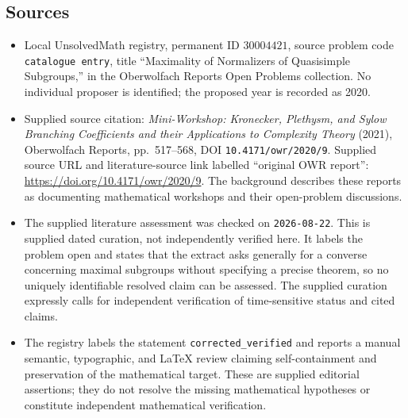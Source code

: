 \documentclass[11pt]{article}
\begin{document}
\subsection{Sources}
\begin{itemize}
\item Local UnsolvedMath registry, permanent ID \(30004421\), source problem code \texttt{catalogue entry}, title ``Maximality of Normalizers of Quasisimple Subgroups,'' in the Oberwolfach Reports Open Problems collection. No individual proposer is identified; the proposed year is recorded as 2020.
\item Supplied source citation: \emph{Mini-Workshop: Kronecker, Plethysm, and Sylow Branching Coefficients and their Applications to Complexity Theory} (2021), Oberwolfach Reports, pp.\ 517--568, DOI \texttt{10.4171/owr/2020/9}. Supplied source URL and literature-source link labelled ``original OWR report'': \url{https://doi.org/10.4171/owr/2020/9}. The background describes these reports as documenting mathematical workshops and their open-problem discussions.
\item The supplied literature assessment was checked on \texttt{2026-08-22}. This is supplied dated curation, not independently verified here. It labels the problem open and states that the extract asks generally for a converse concerning maximal subgroups without specifying a precise theorem, so no uniquely identifiable resolved claim can be assessed. The supplied curation expressly calls for independent verification of time-sensitive status and cited claims.
\item The registry labels the statement \texttt{corrected\_verified} and reports a manual semantic, typographic, and LaTeX review claiming self-containment and preservation of the mathematical target. These are supplied editorial assertions; they do not resolve the missing mathematical hypotheses or constitute independent mathematical verification.
\end{itemize}
\end{document}
